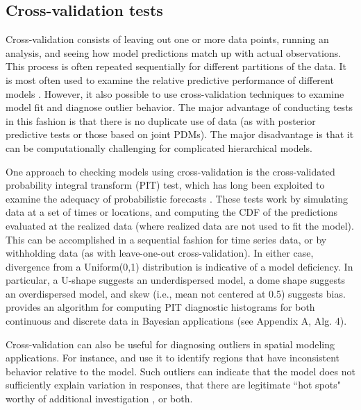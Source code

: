 \documentclass[12pt,english]{article}
\begin{document}
\begin{spacing}{1.9}
\subsection{Cross-validation tests}

Cross-validation consists of leaving out one or more data points,
running an analysis, and seeing how model predictions match up with
actual observations.  This process is often repeated sequentially for
different partitions of the data.  It is most often used to examine
the relative predictive performance of different models \citep[i.e.,
for model selection; see e.g.][]{ArlotCelisse2010}.  However, it also
possible to use cross-validation techniques to examine model fit and
diagnose outlier behavior.  The major advantage of conducting tests in
this fashion is that there is no duplicate use of data (as with
posterior predictive tests or those based on joint PDMs).  The major
disadvantage is that it can be computationally challenging for
complicated hierarchical models.

One approach to checking models using cross-validation is the
cross-validated probability integral transform (PIT) test, which has
long been exploited to examine the adequacy of probabilistic forecasts
\citep[e.g.,][]{Dawid1984,Fruiiwirth1996,GneitingEtAl2007,CzadoEtAl2009}. These
tests work by simulating data at a set of times or locations, and
computing the CDF of the predictions evaluated at the realized data
(where realized data are not used to fit the model).  This can be
accomplished in a sequential fashion for time series data, or by
withholding data (as with leave-one-out cross-validation).  In either
case, divergence from a Uniform(0,1) distribution is indicative of a
model deficiency.  In particular, a U-shape suggests an underdispersed
model, a dome shape suggests an overdispersed model, and skew (i.e.,
mean not centered at 0.5) suggests bias.  \citet{Congdon2014} provides
an algorithm for computing PIT diagnostic histograms for both
continuous and discrete data in Bayesian applications (see Appendix A,
Alg. 4).

Cross-validation can also be useful for diagnosing outliers in spatial
modeling applications.  For instance, \citet{SternCressie2000} and
\citet{MarshallSpiegelhalter2003} use it to identify regions that have
inconsistent behavior relative to the model.  Such outliers can
indicate that the model does not sufficiently explain variation in
responses, that there are legitimate ``hot spots" worthy of additional
investigation \citep{MarshallSpiegelhalter2003}, or both.


\end{spacing}
\end{document}
